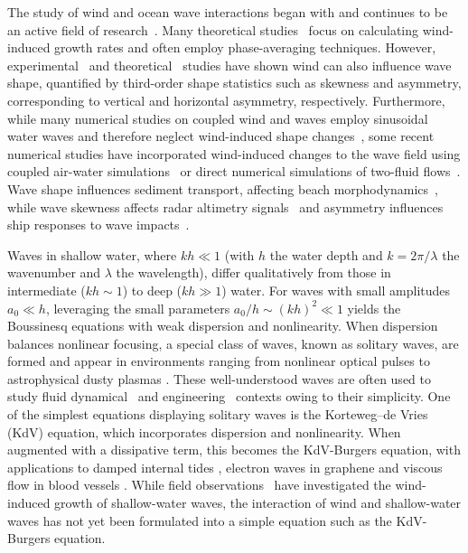 \documentclass{jfm}
\begin{document}
The study of wind and ocean wave interactions began with
\citet{jeffreys1925formation} and continues to be an active field of
research~\citep[\eg][]{janssen1991quasi,donelan2006wave,sulivan2010dynamics}.
Many theoretical
studies~\citep[\eg][]{jeffreys1925formation,miles1957generation,phillips1957generation}
focus on calculating wind-induced growth rates and often employ
phase-averaging techniques.
However,
experimental~\citep[\eg][]{leykin1995asymmetry,feddersen2005wind} and
theoretical~\citep[\eg][]{zdyrski2020wind} studies have shown wind can
also influence wave shape, quantified by third-order shape statistics
such as skewness and asymmetry, corresponding to vertical and horizontal
asymmetry, respectively.
Furthermore, while many numerical studies on coupled wind and waves
employ sinusoidal water waves and therefore neglect wind-induced shape
changes~\citep[\eg][]{hara2015wave,husain2019boundary}, some recent
numerical studies have incorporated wind-induced changes to the
wave field using coupled air-water
simulations~\citep[\eg][]{liu2010numerical,hao2019wind} or direct
numerical simulations of two-fluid
flows~\citep[\eg][]{zonta2015growth,yang2018direct}.
Wave shape influences sediment transport, affecting beach
morphodynamics~\citep[\eg][]{drake2001discrete,hoefel2003wave}, while
wave skewness affects radar altimetry
signals~\citep[\eg][]{hayne1980radar} and asymmetry influences ship
responses to wave impacts~\citep[\eg][]{soares2008abnormal}.

Waves in shallow water, where $kh \ll 1$ (with $h$ the water depth and
$k=2\pi/\lambda$ the wavenumber and $\lambda$ the wavelength), differ
qualitatively from those in intermediate ($kh \sim 1$) to deep ($kh \gg
1$) water.
For waves with small amplitudes $a_0 \ll h$,
leveraging the small parameters $a_0/h \sim (kh)^2 \ll 1$
yields the Boussinesq equations with weak dispersion and nonlinearity.
When dispersion balances nonlinear
focusing, a special class of waves, known as solitary waves, are formed
and appear in environments ranging from nonlinear optical pulses
\citep[\eg][]{kivshar1993dark} to astrophysical dusty plasmas
\citep[\eg][]{sahu2012nonextensive}.
These well-understood waves are often used to study fluid
dynamical~\citep[\eg][]{munk1949solitary,hammack1974korteweg,miles1979korteweg,lin1998numerical}
and
engineering~\citep[\eg][]{monaghan1999solitary,lin2004numerical,xu2018prediction}
contexts owing to their simplicity.
One of the simplest equations displaying solitary waves is the
Korteweg--de Vries (KdV) equation, which incorporates dispersion and
nonlinearity.
When augmented with a dissipative term, this becomes the KdV-Burgers
equation, with applications to damped internal tides
\citep[\eg][]{sandstrom1995dissipation}, electron waves in graphene
\citep[\eg][]{zdyrski2019effects} and viscous flow in blood vessels
\citep[\eg][]{antar1999weakly}.
While field observations~\citep[\eg][]{cavaleri1981wind} have
investigated the wind-induced growth of shallow-water waves, the
interaction of wind and shallow-water waves has not yet been formulated
into a simple equation such as the KdV-Burgers equation.
\end{document}
